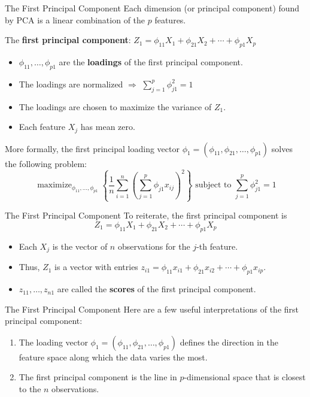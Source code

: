 \documentclass[
  ignorenonframetext,
  aspectratio=169,
]{beamer}
\begin{document}
\begin{frame}{The First Principal Component}
\protect\hypertarget{the-first-principal-component}{}
Each dimension (or principal component) found by PCA is a linear
combination of the \(p\) features.

The \textbf{first principal component}:
\quad \(Z_{1}=\phi_{11} X_{1}+\phi_{21} X_{2}+\cdots+\phi_{p 1} X_{p}\)

\begin{itemize}
\item
  \(\phi_{11}, \ldots, \phi_{p 1}\) are the \textbf{loadings} of the
  first principal component.
\item
  The loadings are normalized \(\Rightarrow\)
  \(\sum_{j=1}^{p} \phi_{j 1}^{2}=1\)
\item
  The loadings are chosen to maximize the variance of \(Z_1\).
\item
  Each feature \(X_j\) has mean zero.
\end{itemize}

More formally, the first principal loading vector
\(\phi_{1}=\left(\phi_{11} , \phi_{21} , \ldots , \phi_{p 1}\right)\)
solves the following problem:
\[\operatorname{maximize}_{\phi_{11}, \ldots, \phi_{p 1}}\left\{\frac{1}{n} \sum_{i=1}^{n}\left(\sum_{j=1}^{p} \phi_{j 1} x_{i j}\right)^{2}\right\} \text{ subject to } \sum_{j=1}^{p} \phi_{j 1}^{2}=1\]
\end{frame}

\begin{frame}{The First Principal Component}
\protect\hypertarget{the-first-principal-component-1}{}
To reiterate, the first principal component is
\[Z_{1}=\phi_{11} X_{1}+\phi_{21} X_{2}+\cdots+\phi_{p 1} X_{p}\]

\begin{itemize}
\item
  Each \(X_j\) is the vector of \(n\) observations for the \(j\)-th
  feature.
\item
  Thus, \(Z_1\) is a vector with entries
  \quad \(z_{i 1}=\phi_{11} x_{i 1}+\phi_{21} x_{i 2}+\cdots+\phi_{p 1} x_{i p}.\)
\item
  \(z_{11}, \ldots, z_{n 1}\) are called the \textbf{scores} of the
  first principal component.
\end{itemize}
\end{frame}

\begin{frame}{The First Principal Component}
\protect\hypertarget{the-first-principal-component-2}{}
Here are a few useful interpretations of the first principal component:

\begin{enumerate}
\item
  The loading vector
  \(\phi_{1}=\left(\phi_{11} , \phi_{21} , \ldots , \phi_{p 1}\right)\)
  defines the direction in the feature space along which the data varies
  the most.
\item
  The first principal component is the line in \(p\)-dimensional space
  that is closest to the \(n\) observations.
\end{enumerate}
\end{frame}
\end{document}
